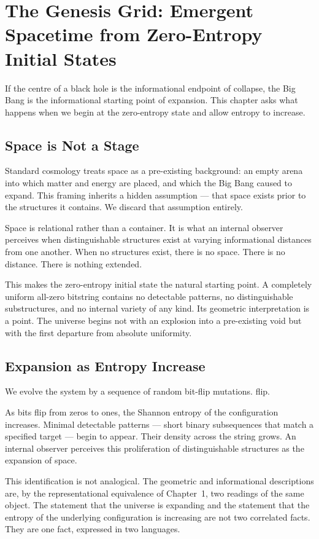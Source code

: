 \chapter{The Genesis Grid: Emergent Spacetime from Zero-Entropy Initial States}

If the centre of a black hole is the informational endpoint of collapse,
the Big Bang is the informational starting point of expansion. This
chapter asks what happens when we begin at the zero-entropy state and
allow entropy to increase. 

\section{Space is Not a Stage}

Standard cosmology treats space as a pre-existing background: an empty
arena into which matter and energy are placed, and which the Big Bang
caused to expand. This framing inherits a hidden assumption --- that
space exists prior to the structures it contains. We 
discard that assumption entirely.

Space is relational rather than a container. It is what an internal
observer perceives when distinguishable structures exist at varying
informational distances from one another. When no structures exist,
there is no space. There is no distance. There is nothing extended.

This makes the zero-entropy initial state the natural starting point. A
completely uniform all-zero bitstring contains no detectable patterns, no
distinguishable substructures, and no internal variety of any kind. Its
geometric interpretation is a point. The universe begins not with an explosion into
a pre-existing void but with the first departure from absolute uniformity.

\section{Expansion as Entropy Increase}

We evolve the system by a sequence of random bit-flip mutations. flip.

As bits flip from zeros to ones, the Shannon entropy of the configuration
increases. Minimal detectable patterns --- short binary subsequences that
match a specified target --- begin to appear. Their density across the
string grows. An internal observer perceives this proliferation of
distinguishable structures as the expansion of space.

This identification is not analogical. The geometric and informational
descriptions are, by the representational equivalence of Chapter~1, two
readings of the same object. The statement that the universe is expanding
and the statement that the entropy of the underlying configuration is
increasing are not two correlated facts. They are one fact, expressed in
two languages.

